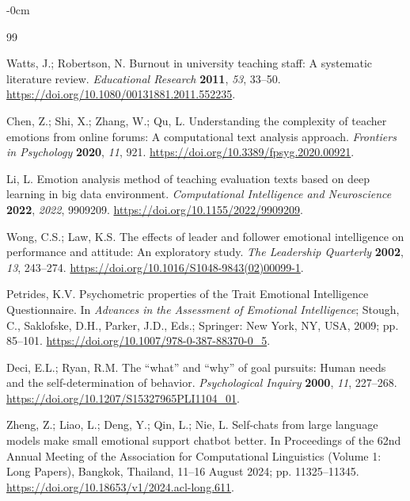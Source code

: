 \documentclass[higheredu,article,submit,pdftex,moreauthors]{Definitions/mdpi}
\begin{document}
\begin{adjustwidth}{-\extralength}{0cm}

\begin{thebibliography}{99}

Watts, J.; Robertson, N. Burnout in university teaching staff: A systematic literature review. \textit{Educational Research} \textbf{2011}, \textit{53}, 33--50. \href{https://doi.org/10.1080/00131881.2011.552235}{https://doi.org/10.1080/00131881.2011.552235}.

Chen, Z.; Shi, X.; Zhang, W.; Qu, L. Understanding the complexity of teacher emotions from online forums: A computational text analysis approach. \textit{Frontiers in Psychology} \textbf{2020}, \textit{11}, 921. \href{https://doi.org/10.3389/fpsyg.2020.00921}{https://doi.org/10.3389/fpsyg.2020.00921}.

Li, L. Emotion analysis method of teaching evaluation texts based on deep learning in big data environment. \textit{Computational Intelligence and Neuroscience} \textbf{2022}, \textit{2022}, 9909209. \href{https://doi.org/10.1155/2022/9909209}{https://doi.org/10.1155/2022/9909209}.

Wong, C.S.; Law, K.S. The effects of leader and follower emotional intelligence on performance and attitude: An exploratory study. \textit{The Leadership Quarterly} \textbf{2002}, \textit{13}, 243--274. \href{https://doi.org/10.1016/S1048-9843(02)00099-1}{https://doi.org/10.1016/S1048-9843(02)00099-1}.

Petrides, K.V. Psychometric properties of the Trait Emotional Intelligence Questionnaire. In \textit{Advances in the Assessment of Emotional Intelligence}; Stough, C., Saklofske, D.H., Parker, J.D., Eds.; Springer: New York, NY, USA, 2009; pp. 85--101. \href{https://doi.org/10.1007/978-0-387-88370-0_5}{https://doi.org/10.1007/978-0-387-88370-0\_5}.

Deci, E.L.; Ryan, R.M. The ``what'' and ``why'' of goal pursuits: Human needs and the self-determination of behavior. \textit{Psychological Inquiry} \textbf{2000}, \textit{11}, 227--268. \href{https://doi.org/10.1207/S15327965PLI1104_01}{https://doi.org/10.1207/S15327965PLI1104\_01}.

Zheng, Z.; Liao, L.; Deng, Y.; Qin, L.; Nie, L. Self-chats from large language models make small emotional support chatbot better. In Proceedings of the 62nd Annual Meeting of the Association for Computational Linguistics (Volume 1: Long Papers), Bangkok, Thailand, 11--16 August 2024; pp. 11325--11345. \href{https://doi.org/10.18653/v1/2024.acl-long.611}{https://doi.org/10.18653/v1/2024.acl-long.611}.


\end{thebibliography}
\end{adjustwidth}
\end{document}
